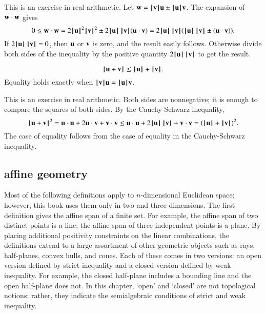 \begin{proved}
  This is an exercise in real arithmetic.  Let $\w = \normo{\v} \u \pm
  \normo{\u} \v$.  The expansion of $\w\cdot \w$ gives
  \begin{displaymath}0\le \w\cdot \w = 2\normo{\u}^2\normo{\v}^2 \pm
    2\normo{\u}\, \normo{\v} (\u\cdot \v) = 2\normo{\u}\, \normo{\v}
    (\normo{\u}\, \normo{\v} \pm (\u \cdot \v)).\end{displaymath} If
  $2\normo{\u} \,\normo{\v} = 0$, then $\u$ or $\v$ is zero, and the
  result easily follows.  Otherwise divide both sides of the
  inequality by the positive quantity $2 \normo{\u} \,\normo{\v}$ to
  get the result.  \swallowed\end{proved}

\begin{lemma}
\label{lemma:triangle-ineq}
\begin{displaymath}
\normo{\u + \v} \le \normo{\u} + \normo{\v }.
\end{displaymath}
Equality holds exactly when $\normo{\v}\u = \normo{\u}\v$.
\end{lemma}
%

\begin{proved}  This is an exercise in real arithmetic.
Both sides are nonnegative; it is enough to compare the squares of
both sides.  By the Cauchy-Schwarz inequality,
\begin{displaymath}\normo{\u + \v}^2 = \u\cdot \u + 2 \u\cdot \v + \v\cdot \v \le
  \u\cdot \u + 2 \normo{ \u}\,\normo{\v} + \v\cdot \v = (\normo{\u}+\normo{\v})^2.
\end{displaymath}
The case of equality follows from the case of equality in the
Cauchy-Schwarz inequality.
\swallowed\end{proved}



\subsection{affine geometry}




\begin{summary}Most of the following definitions apply to
  $n$-dimensional Euclidean space; however, this book uses them only
  in two and three dimensions.  The first definition gives the affine
  span of a finite set.  For example, the affine span of two distinct
  points is a line; the affine span of three independent points is a
  plane.  By placing additional positivity constraints on the linear
  combinations, the definitions extend to a large assortment of other
  geometric objects such as rays, half-planes, convex hulls, and
  cones.  Each of these comes in two versions: an open version defined
  by strict inequality and a closed version defined by weak
  inequality.  For example, the closed half-plane includes a bounding
  line and the open half-plane does not.  In this chapter, `open' and
  `closed' are not topological notions; rather, they indicate the
  semialgebraic conditions of strict and weak inequality.
\end{summary}

